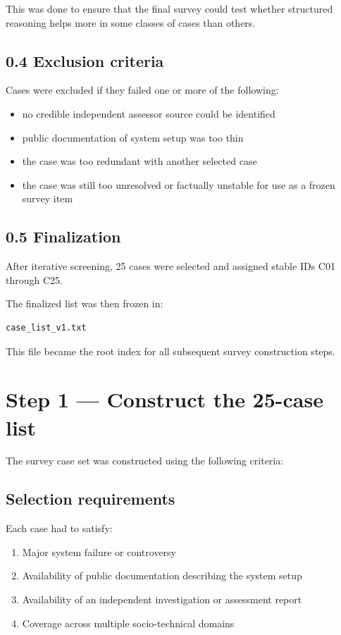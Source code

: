 {This was done to ensure that the final survey could test whether structured reasoning helps more in some classes of cases than others.

\subsection*{0.4 Exclusion criteria}

Cases were excluded if they failed one or more of the following:

\begin{itemize}
\item no credible independent assessor source could be identified
\item public documentation of system setup was too thin
\item the case was too redundant with another selected case
\item the case was still too unresolved or factually unstable for use as a frozen survey item
\end{itemize}

\subsection*{0.5 Finalization}

After iterative screening, 25 cases were selected and assigned stable IDs C01 through C25.

The finalized list was then frozen in:

\begin{verbatim}
case_list_v1.txt
\end{verbatim}

This file became the root index for all subsequent survey construction steps.

\section*{Step 1 — Construct the 25-case list}

The survey case set was constructed using the following criteria:

\subsection*{Selection requirements}

Each case had to satisfy:

\begin{enumerate}
\item Major system failure or controversy
\item Availability of public documentation describing the system setup
\item Availability of an independent investigation or assessment report
\item Coverage across multiple socio-technical domains
\end{enumerate}

}
